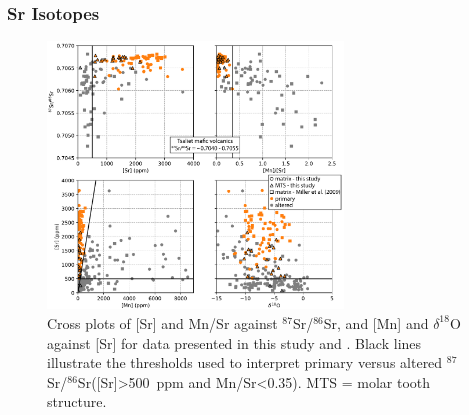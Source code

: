 \documentclass[11pt,letterpaper]{article}
\newcommand{\dO}{$\delta^{18}$O\xspace}
\newcommand{\SrSr}{$^{87}$Sr/$^{86}$Sr\xspace}
\begin{document}
\subsubsection*{Sr Isotopes}

\begin{figure}[h!]
\begin{center}
	\includegraphics[width=0.7\textwidth]{Figures/Sr_Diagenesis.pdf}
	\caption{Cross plots of [Sr] and Mn/Sr against \SrSr, and [Mn] and \dO against [Sr] for data presented in this study and \citet{Miller2009a}. Black lines illustrate the thresholds used to interpret primary versus altered \SrSr ([Sr]\textgreater500~ppm and Mn/Sr\textless0.35). MTS = molar tooth structure.}
	\label{fig:Sr_Diagenesis}
\end{center}
\end{figure}
\end{document}
